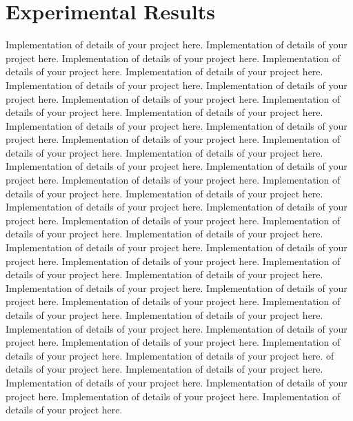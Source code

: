 \chapter{Experimental Results}


Implementation of details of  your project here. Implementation of details of  your project here. Implementation of details of  your project here. Implementation of details of  your project here. Implementation of details of  your project here. Implementation of details of  your project here. Implementation of details of  your project here. Implementation of details of  your project here. Implementation of details of  your project here. Implementation of details of  your project here. Implementation of details of  your project here. Implementation of details of  your project here. Implementation of details of  your project here. Implementation of details of  your project here. Implementation of details of  your project here. Implementation of details of  your project here. Implementation of details of  your project here. Implementation of details of  your project here. Implementation of details of  your project here. Implementation of details of  your project here. Implementation of details of  your project here. Implementation of details of  your project here. Implementation of details of  your project here. Implementation of details of  your project here. Implementation of details of  your project here. Implementation of details of  your project here. Implementation of details of  your project here. Implementation of details of  your project here. Implementation of details of  your project here. Implementation of details of  your project here. Implementation of details of  your project here. Implementation of details of  your project here. Implementation of details of  your project here. Implementation of details of  your project here. Implementation of details of  your project here. Implementation of details of  your project here. Implementation of details of  your project here. Implementation of details of  your project here. Implementation of details of  your project here. Implementation of details of  your project here.  of details of  your project here. Implementation of details of  your project here. Implementation of details of  your project here. Implementation of details of  your project here. Implementation of details of  your project here. Implementation of details of  your project here. 

